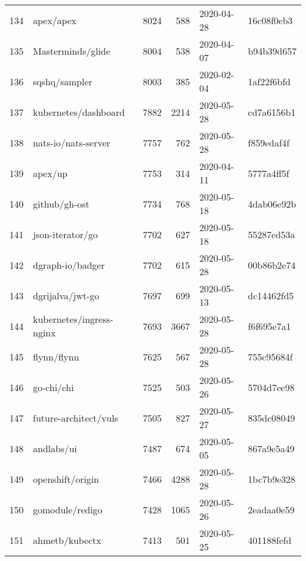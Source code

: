 \begin{longtable}{llrrll}
    134 &                                          apex/apex &   8024 &    588 & 2020-04-28 &  16c08f0eb3 \\
    135 &                                  Masterminds/glide &   8004 &    538 & 2020-04-07 &  b94b39d657 \\
    136 &                                      sqshq/sampler &   8003 &    385 & 2020-02-04 &  1af22f6bfd \\
    137 &                               kubernetes/dashboard &   7882 &   2214 & 2020-05-28 &  cd7a6156b1 \\
    138 &                                nats-io/nats-server &   7757 &    762 & 2020-05-28 &  f859edaf4f \\
    139 &                                            apex/up &   7753 &    314 & 2020-04-11 &  5777a4ff5f \\
    140 &                                      github/gh-ost &   7734 &    768 & 2020-05-18 &  4dab06e92b \\
    141 &                                   json-iterator/go &   7702 &    627 & 2020-05-18 &  55287ed53a \\
    142 &                                   dgraph-io/badger &   7702 &    615 & 2020-05-28 &  00b86b2e74 \\
    143 &                                   dgrijalva/jwt-go &   7697 &    699 & 2020-05-13 &  dc14462fd5 \\
    144 &                           kubernetes/ingress-nginx &   7693 &   3667 & 2020-05-28 &  f6f695e7a1 \\
    145 &                                        flynn/flynn &   7625 &    567 & 2020-05-28 &  755c95684f \\
    146 &                                         go-chi/chi &   7525 &    503 & 2020-05-26 &  5704d7ee98 \\
    147 &                              future-architect/vuls &   7505 &    827 & 2020-05-27 &  835dc08049 \\
    148 &                                         andlabs/ui &   7487 &    674 & 2020-05-05 &  867a9e5a49 \\
    149 &                                   openshift/origin &   7466 &   4288 & 2020-05-28 &  1bc7b9e328 \\
    150 &                                    gomodule/redigo &   7428 &   1065 & 2020-05-26 &  2eadaa0e59 \\
    151 &                                     ahmetb/kubectx &   7413 &    501 & 2020-05-25 &  401188fefd \\

\end{longtable}

